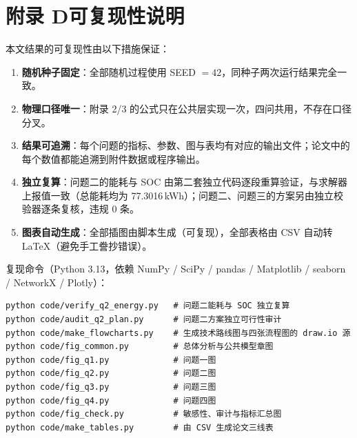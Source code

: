 \section*{附录 D\quad 可复现性说明}

本文结果的可复现性由以下措施保证：

\begin{enumerate}[label=\arabic*.]
	\item \textbf{随机种子固定}：全部随机过程使用 SEED $=42$，同种子两次运行结果完全一致。
	\item \textbf{物理口径唯一}：附录 2/3 的公式只在公共层实现一次，四问共用，不存在口径分叉。
	\item \textbf{结果可追溯}：每个问题的指标、参数、图与表均有对应的输出文件；论文中的每个数值都能追溯到附件数据或程序输出。
	\item \textbf{独立复算}：问题二的能耗与 SOC 由第二套独立代码逐段重算验证，与求解器上报值一致（总能耗均为 77.3016\,kWh）；问题二、问题三的方案另由独立校验器逐条复核，违规 0 条。
	\item \textbf{图表自动生成}：全部插图由脚本生成（可复现），全部表格由 CSV 自动转 LaTeX（避免手工誊抄错误）。
\end{enumerate}

复现命令（Python 3.13，依赖 NumPy / SciPy / pandas / Matplotlib / seaborn / NetworkX / Plotly）：

\begin{lstlisting}[style=Python, basicstyle=\zihao{-5}\ttfamily, frame=single]
python code/verify_q2_energy.py   # 问题二能耗与 SOC 独立复算
python code/audit_q2_plan.py      # 问题二方案独立可行性审计
python code/make_flowcharts.py    # 生成技术路线图与四张流程图的 draw.io 源
python code/fig_common.py         # 总体分析与公共模型章图
python code/fig_q1.py             # 问题一图
python code/fig_q2.py             # 问题二图
python code/fig_q3.py             # 问题三图
python code/fig_q4.py             # 问题四图
python code/fig_check.py          # 敏感性、审计与指标汇总图
python code/make_tables.py        # 由 CSV 生成论文三线表
\end{lstlisting}
